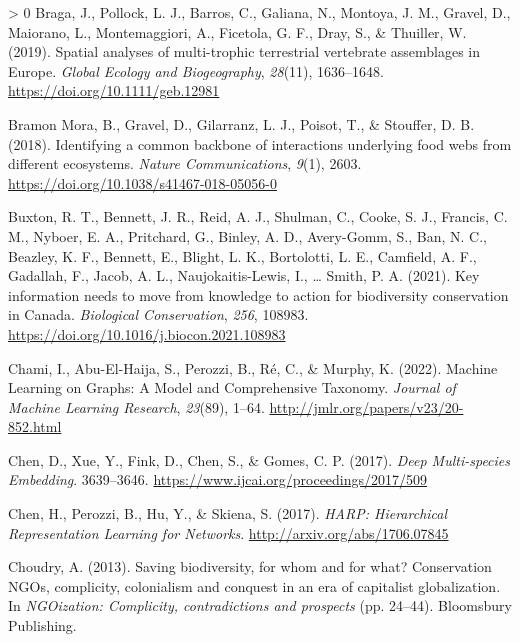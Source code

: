\documentclass[11pt]{article}
\newlength{\cslhangindent}
\newenvironment{CSLReferences}[3] %
 {%
  \setlength{\parindent}{0pt}
  \ifodd #1 \everypar{\setlength{\hangindent}{\cslhangindent}}\ignorespaces\fi
  \ifnum #2 > 0
  \setlength{\parskip}{#2\baselineskip}
  \fi
 }%
 {}
\begin{document}
\begin{CSLReferences}{1}{0}
\leavevmode\hypertarget{ref-Braga2019SpaAna}{}%
Braga, J., Pollock, L. J., Barros, C., Galiana, N., Montoya, J. M.,
Gravel, D., Maiorano, L., Montemaggiori, A., Ficetola, G. F., Dray, S.,
\& Thuiller, W. (2019). Spatial analyses of multi-trophic terrestrial
vertebrate assemblages in Europe. \emph{Global Ecology and
Biogeography}, \emph{28}(11), 1636--1648.
\url{https://doi.org/10.1111/geb.12981}

\leavevmode\hypertarget{ref-BramonMora2018IdeCom}{}%
Bramon Mora, B., Gravel, D., Gilarranz, L. J., Poisot, T., \& Stouffer,
D. B. (2018). Identifying a common backbone of interactions underlying
food webs from different ecosystems. \emph{Nature Communications},
\emph{9}(1), 2603. \url{https://doi.org/10.1038/s41467-018-05056-0}

\leavevmode\hypertarget{ref-Buxton2021KeyInf}{}%
Buxton, R. T., Bennett, J. R., Reid, A. J., Shulman, C., Cooke, S. J.,
Francis, C. M., Nyboer, E. A., Pritchard, G., Binley, A. D., Avery-Gomm,
S., Ban, N. C., Beazley, K. F., Bennett, E., Blight, L. K., Bortolotti,
L. E., Camfield, A. F., Gadallah, F., Jacob, A. L., Naujokaitis-Lewis,
I., \ldots{} Smith, P. A. (2021). Key information needs to move from
knowledge to action for biodiversity conservation in Canada.
\emph{Biological Conservation}, \emph{256}, 108983.
\url{https://doi.org/10.1016/j.biocon.2021.108983}

\leavevmode\hypertarget{ref-Chami2022MacLea}{}%
Chami, I., Abu-El-Haija, S., Perozzi, B., Ré, C., \& Murphy, K. (2022).
Machine Learning on Graphs: A Model and Comprehensive Taxonomy.
\emph{Journal of Machine Learning Research}, \emph{23}(89), 1--64.
\url{http://jmlr.org/papers/v23/20-852.html}

\leavevmode\hypertarget{ref-Chen2017DeeMul}{}%
Chen, D., Xue, Y., Fink, D., Chen, S., \& Gomes, C. P. (2017).
\emph{Deep Multi-species Embedding}. 3639--3646.
\url{https://www.ijcai.org/proceedings/2017/509}

\leavevmode\hypertarget{ref-Chen2017HarHie}{}%
Chen, H., Perozzi, B., Hu, Y., \& Skiena, S. (2017). \emph{HARP:
Hierarchical Representation Learning for Networks}.
\url{http://arxiv.org/abs/1706.07845}

\leavevmode\hypertarget{ref-Choudry2013SavBio}{}%
Choudry, A. (2013). Saving biodiversity, for whom and for what?
Conservation NGOs, complicity, colonialism and conquest in an era of
capitalist globalization. In \emph{NGOization: Complicity,
contradictions and prospects} (pp. 24--44). Bloomsbury Publishing.


\end{CSLReferences}
\end{document}
